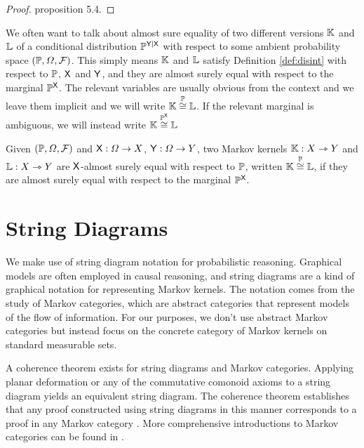 \begin{proof}
\citet{cho_disintegration_2019} proposition 5.4.
\end{proof}

We often want to talk about almost sure equality of two different versions $\mathbb{K}$ and $\mathbb{L}$ of a conditional distribution $\mathbb{P}^{\mathsf{Y}|\mathsf{X}}$ with respect to some ambient probability space $(\mathbb{P},\Omega,\mathcal{F})$. This simply means $\mathbb{K}$ and $\mathbb{L}$ satisfy Definition \ref{def:disint} with respect to $\mathbb{P}$, $\mathsf{X}$ and $\mathsf{Y}$, and they are almost surely equal with respect to the marginal $\mathbb{P}^{\mathsf{X}}$. The relevant variables are usually obvious from the context and we leave them implicit and we will write $\mathbb{K}\overset{\mathbb{P}}{\cong}\mathbb{L}$. If the relevant marginal is ambiguous, we will instead write $\mathbb{K}\overset{\mathbb{P}^{\mathsf{X}}}{\cong}\mathbb{L}$

\begin{definition}
Given $(\mathbb{P},\Omega,\mathcal{F})$ and $\mathsf{X}:\Omega\to X$, $\mathsf{Y}:\Omega\to Y$, two Markov kernels $\mathbb{K}:X\rightarrowtriangle Y$ and $\mathbb{L}:X\rightarrowtriangle Y$ are $\mathsf{X}$-almost surely equal with respect to $\mathbb{P}$, written $\mathbb{K}\overset{\mathbb{P}}{\cong}\mathbb{L}$, if they are almost surely equal with respect to the marginal $\mathbb{P}^{\mathsf{X}}$.
\end{definition}

\section{String Diagrams}\label{ssec:mken_diagrams}

We make use of string diagram notation for probabilistic reasoning. Graphical models are often employed in causal reasoning, and string diagrams are a kind of graphical notation for representing Markov kernels. The notation comes from the study of Markov categories, which are abstract categories that represent models of the flow of information. For our purposes, we don't use abstract Markov categories but instead focus on the concrete category of Markov kernels on standard measurable sets.

A coherence theorem exists for string diagrams and Markov categories. Applying planar deformation or any of the commutative comonoid axioms to a string diagram yields an equivalent string diagram. The coherence theorem establishes that any proof constructed using string diagrams in this manner corresponds to a proof in any Markov category \citep{selinger_survey_2011}. More comprehensive introductions to Markov categories can be found in \citet{fritz_synthetic_2020,cho_disintegration_2019}.

